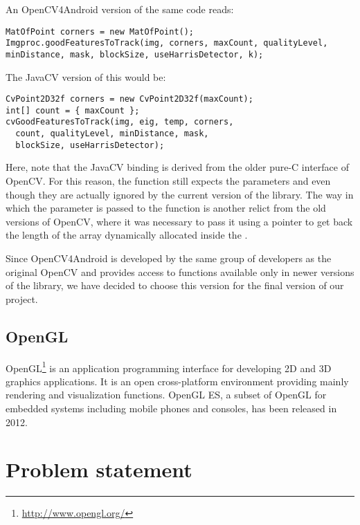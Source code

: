 An OpenCV4Android version of the same code reads: 

\begin{lstlisting} 
MatOfPoint corners = new MatOfPoint();
Imgproc.goodFeaturesToTrack(img, corners, maxCount, qualityLevel, minDistance, mask, blockSize, useHarrisDetector, k);
\end{lstlisting} 

The JavaCV version of this would be: 

\begin{lstlisting} 
CvPoint2D32f corners = new CvPoint2D32f(maxCount);
int[] count = { maxCount };
cvGoodFeaturesToTrack(img, eig, temp, corners,
  count, qualityLevel, minDistance, mask,
  blockSize, useHarrisDetector);
\end{lstlisting}

Here, note that the JavaCV binding is derived from the older pure-C interface of OpenCV. 
For this reason, the function still expects the parameters  and  even though they are actually ignored by the current version of the library. 
The way in which the  parameter is passed to the function is another relict from the old versions of OpenCV, where it was necessary to pass it using a pointer to get back the length of the array  dynamically allocated inside the .

Since OpenCV4Android is developed by the same group of developers as the original OpenCV and provides access to functions available only in newer versions of the library, we have decided to choose this version for the final version of our project. 

\subsection{OpenGL} 

OpenGL\footnote{\url{http://www.opengl.org/}} is an application programming interface for developing 2D and 3D graphics applications.
It is an open cross-platform environment providing mainly rendering and visualization functions.
OpenGL ES, a subset of OpenGL for embedded systems including mobile phones and consoles, has been released in 2012. 


\section{Problem statement} 
\label{prob}

